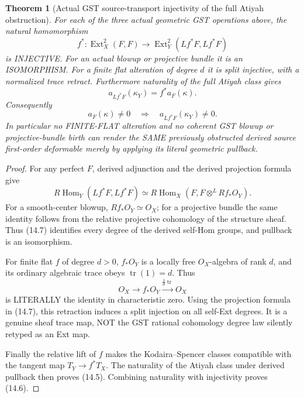 \documentclass[11pt,a4paper]{article}
\newtheorem{theorem}{Theorem}[section]
\begin{document}
\begin{theorem}[Actual GST source-transport injectivity of the full Atiyah obstruction]
For each
of the three
actual geometric
GST operations
above, the
natural homomorphism
\[
 \boxed{
 f^*:
 \operatorname{Ext}^2_X(F,F)
 \longrightarrow
 \operatorname{Ext}^2_Y(
              Lf^*F,Lf^*F)
 }                                                       \tag{14.4}
\]
is INJECTIVE.
For an actual
blowup or projective
bundle it is
an ISOMORPHISM.
For a finite
flat alteration
of degree \(d\)
it is split
injective, with
a normalized
trace retract.
Furthermore
naturality of
the full Atiyah
class gives
\[
 \boxed{
 a_{Lf^*F}(\kappa_Y)
           =f^*a_F(\kappa).
 }                                                       \tag{14.5}
\]
Consequently
\[
 \boxed{
 a_F(\kappa)\ne0
 \quad\Longrightarrow\quad
 a_{Lf^*F}(\kappa_Y)\ne0.
 }                                                       \tag{14.6}
\]
In particular
no FINITE-FLAT
alteration
and no coherent
GST blowup or
projective-bundle
birth can render
the SAME
previously obstructed
derived source
first-order deformable
merely by applying
its literal geometric
pullback.
\end{theorem}
\begin{proof}
For any perfect
\(F\), derived
adjunction and
the derived
projection formula
give
\[
 R\operatorname{Hom}_Y(
       Lf^*F,Lf^*F)
 \simeq
 R\operatorname{Hom}_X(
       F,F\otimes^{L}
                       Rf_*O_Y).
                                                               \tag{14.7}
\]
For a smooth-center
blowup,
\(Rf_*O_Y\simeq O_X\);
for a projective
bundle the same
identity follows
from the
relative projective
cohomology of
the structure sheaf.
Thus (14.7)
identifies every
degree of
the derived
self-Hom groups,
and pullback
is an isomorphism.

For finite
flat \(f\)
of degree \(d>0\),
\(f_*O_Y\) is
a locally free
\(O_X\)-algebra
of rank \(d\),
and its ordinary
algebraic trace
obeys
\(\operatorname{tr}(1)=d\).
Thus
\[
 O_X\longrightarrow f_*O_Y
 \xrightarrow{\frac1d\operatorname{tr}}
 O_X
\]
is LITERALLY
the identity
in characteristic
zero. Using
the projection
formula in
(14.7), this
retraction induces
a split
injection on
all self-Ext
degrees.
It is a
genuine sheaf
trace map,
NOT the
GST rational
cohomology
degree law
silently retyped
as an Ext map.

Finally the
relative lift
of \(f\)
makes the
Kodaira--Spencer
classes compatible
with the tangent
map \(T_Y\to f^*T_X\).
The naturality
of the Atiyah
class under
derived pullback
then proves
(14.5).
Combining
naturality with
injectivity proves
(14.6).
\end{proof}
\end{document}

